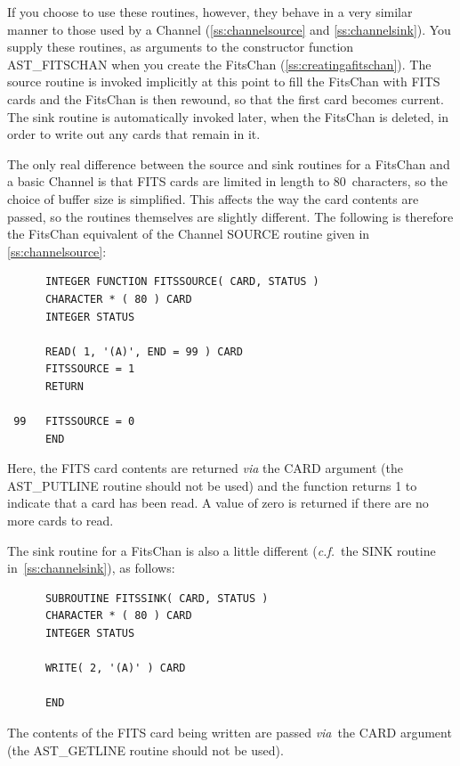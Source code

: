 \documentclass[twoside,11pt]{article}
\newcommand{\htmlref}[2]{#1}
\newcommand{\secref}[1]{\S\ref{#1}}
\renewcommand{\secref}[1]{\ref{#1}}
\begin{document}
If you choose to use these routines, however, they behave in a very
similar manner to those used by a \htmlref{Channel}{Channel} (\secref{ss:channelsource}
and \secref{ss:channelsink}). You supply these routines, as arguments
to the constructor function \htmlref{AST\_FITSCHAN}{AST_FITSCHAN} when you create the FitsChan
(\secref{ss:creatingafitschan}). The source routine is invoked
implicitly at this point to fill the FitsChan with FITS cards and the
FitsChan is then rewound, so that the first card becomes current. The
sink routine is automatically invoked later, when the FitsChan is
deleted, in order to write out any cards that remain in it.


The only real difference between the source and sink routines for a
FitsChan and a basic Channel is that FITS cards are limited in length
to 80~characters, so the choice of buffer size is simplified.  This
affects the way the card contents are passed, so the routines
themselves are slightly different.  The following is therefore the
FitsChan equivalent of the Channel SOURCE routine given in
\secref{ss:channelsource}:

\small
\begin{verbatim}
      INTEGER FUNCTION FITSSOURCE( CARD, STATUS )
      CHARACTER * ( 80 ) CARD
      INTEGER STATUS

      READ( 1, '(A)', END = 99 ) CARD
      FITSSOURCE = 1
      RETURN

 99   FITSSOURCE = 0
      END
\end{verbatim}
\normalsize

Here, the FITS card contents are returned {\em{via}} the CARD argument
(the \htmlref{AST\_PUTLINE}{AST_PUTLINE} routine should not be used) and the function returns
1 to indicate that a card has been read. A value of zero is returned
if there are no more cards to read.

The sink routine for a FitsChan is also a little different
({\em{c.f.}}\ the SINK routine in~\secref{ss:channelsink}), as
follows:

\small
\begin{verbatim}
      SUBROUTINE FITSSINK( CARD, STATUS )
      CHARACTER * ( 80 ) CARD
      INTEGER STATUS

      WRITE( 2, '(A)' ) CARD

      END
\end{verbatim}
\normalsize

The contents of the FITS card being written are passed {\em{via}}\ the
CARD argument (the \htmlref{AST\_GETLINE}{AST_GETLINE} routine should not be used).
\end{document}
